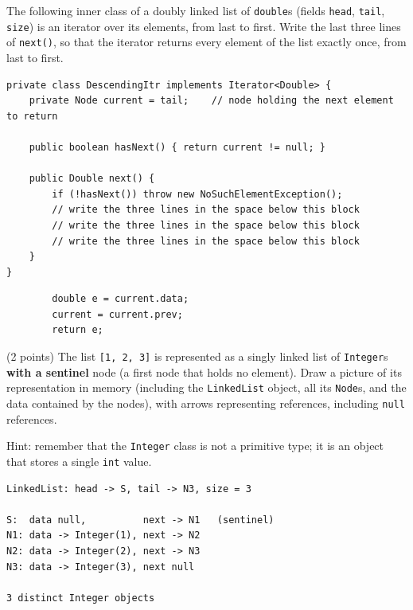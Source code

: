 \begin{question}
The following inner class of a doubly linked list of \lstinline|double|s (fields \lstinline|head|, \lstinline|tail|, \lstinline|size|) is an iterator over its elements, from last to first.
Write the last three lines of \lstinline|next()|, so that the iterator returns every element of the list exactly once, from last to first.

\begin{lstlisting}
private class DescendingItr implements Iterator<Double> {
    private Node current = tail;    // node holding the next element to return

    public boolean hasNext() { return current != null; }

    public Double next() {
        if (!hasNext()) throw new NoSuchElementException();
        // write the three lines in the space below this block
        // write the three lines in the space below this block
        // write the three lines in the space below this block
    }
}
\end{lstlisting}

\ifanswers
\begin{lstlisting}
        double e = current.data;
        current = current.prev;
        return e;
\end{lstlisting}
\else
\vspace{1.2in}
\fi
\end{question}

\begin{question}
(2 points) The list \lstinline|[1, 2, 3]| is represented as a singly linked list of \lstinline|Integer|s \textbf{with a sentinel} node (a first node that holds no element).
Draw a picture of its representation in memory (including the \lstinline|LinkedList| object, all its \lstinline|Node|s, and the data contained by the nodes), with arrows representing references, including \lstinline|null| references.

Hint: remember that the \lstinline|Integer| class is not a primitive type; it is an object that stores a single \lstinline|int| value.

\ifanswers
\begin{verbatim}
LinkedList: head -> S, tail -> N3, size = 3

S:  data null,          next -> N1   (sentinel)
N1: data -> Integer(1), next -> N2
N2: data -> Integer(2), next -> N3
N3: data -> Integer(3), next null

3 distinct Integer objects
\end{verbatim}
\else
\vspace{3in}
\fi
\end{question}
